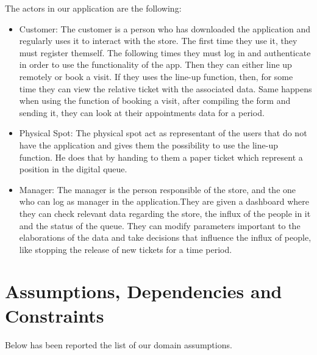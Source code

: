 The actors in our application are the following:

\begin{itemize}

	\item Customer: The customer is a person who has downloaded the application and regularly uses it to interact with the store. The first time they use it, 			they must register themself. The following times they must log in and authenticate in order to use the functionality of the app. Then they can either line up 			remotely or book a visit. If they uses the line-up function, then, for some time they can view the relative ticket with the associated data. Same happens
	when using the function of booking a visit, after compiling the form and sending it, they can look at their appointments data for a period.
	\item Physical Spot: The physical spot act as representant of the users that do not have the application and gives them the possibility to use the line-up 			function. He does that by handing to them a paper ticket which represent a position in the digital queue.
	\item Manager: The manager is the person responsible of the store, and the one who can log as manager in the application.They are given a dashboard 			where they can check relevant data regarding the store, the influx of the people in it and the status of the queue. They can modify parameters important to 			the elaborations of the data and take decisions that influence the influx of people, like stopping the release of new tickets for a time period. 

\end{itemize}

\section{Assumptions, Dependencies and Constraints}

Below has been reported the list of our domain assumptions.

